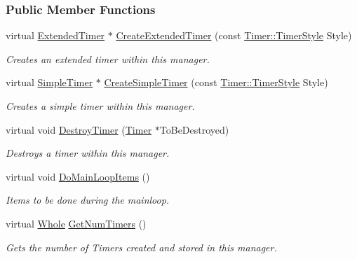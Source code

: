 \subsubsection*{Public Member Functions}
\begin{DoxyCompactItemize}
\item 
virtual \hyperlink{classphys_1_1ExtendedTimer}{ExtendedTimer} $\ast$ \hyperlink{classphys_1_1TimerManager_a44ba4749b2ca6c31994813e97f88ec79}{CreateExtendedTimer} (const \hyperlink{classphys_1_1Timer_a1ee86bf43e20329d750c5d582dcce329}{Timer::TimerStyle} Style)
\begin{DoxyCompactList}\small\item\em Creates an extended timer within this manager. \item\end{DoxyCompactList}\item 
virtual \hyperlink{classphys_1_1SimpleTimer}{SimpleTimer} $\ast$ \hyperlink{classphys_1_1TimerManager_a7d666a65aee80dd354dfdd6de671e186}{CreateSimpleTimer} (const \hyperlink{classphys_1_1Timer_a1ee86bf43e20329d750c5d582dcce329}{Timer::TimerStyle} Style)
\begin{DoxyCompactList}\small\item\em Creates a simple timer within this manager. \item\end{DoxyCompactList}\item 
virtual void \hyperlink{classphys_1_1TimerManager_ae2dc6385cf9997aacd61ea5a0f9f1c66}{DestroyTimer} (\hyperlink{classphys_1_1Timer}{Timer} $\ast$ToBeDestroyed)
\begin{DoxyCompactList}\small\item\em Destroys a timer within this manager. \item\end{DoxyCompactList}\item 
virtual void \hyperlink{classphys_1_1TimerManager_a98b7e74fe1e3eff7aee506477abe2a9c}{DoMainLoopItems} ()
\begin{DoxyCompactList}\small\item\em Items to be done during the mainloop. \item\end{DoxyCompactList}\item 
virtual \hyperlink{namespacephys_a460f6bc24c8dd347b05e0366ae34f34a}{Whole} \hyperlink{classphys_1_1TimerManager_a70ea3a58c3b71cd79a3e9a8b0f069dd5}{GetNumTimers} ()
\begin{DoxyCompactList}\small\item\em Gets the number of Timers created and stored in this manager. \item\end{DoxyCompactList}\item 

\end{DoxyCompactItemize}
